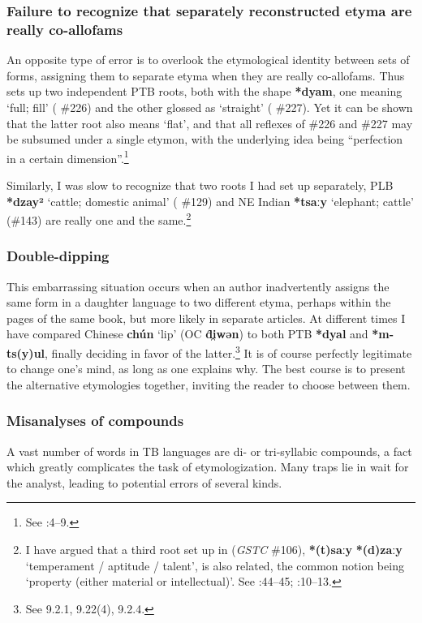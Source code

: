 \subsubsection{Failure to recognize that separately reconstructed etyma are really co-allofams}

An opposite type of error is to overlook the etymological identity between sets
of forms, assigning them to separate etyma when they are really co-allofams.
Thus \textit{} sets up two independent PTB roots, both with the shape \textbf{*dyam}, one
meaning ‘full; fill’ (\textit{} \#226) and the other glossed as ‘straight’ (\textit{} \#227).
Yet it can be shown that the latter root also means ‘flat’, and that all
reflexes of \#226 and \#227 may be subsumed under a single etymon, with the
underlying idea being “perfection in a certain dimension”.\footnote{See \citealt{JAM-DL}:4–9.}


Similarly, I was slow to recognize that two roots I had set up separately,
PLB \textbf{*dzay²} ‘cattle; domestic animal’ (\citealt{JAM-GSTC} \#129)
and NE Indian \textbf{*tsaːy} ‘elephant;
cattle’ (\#143) are really one and the same.\footnote{I have argued that a
third root set up in \citealt{JAM-GSTC} (\textit{GSTC} \#106), \textbf{*(t)saːy}  \textbf{*(d)zaːy} ‘temperament / aptitude / talent’, is also related, the common notion being ‘property (either material or
intellectual)’. See \citealt{JAM-GSTC}:44–45; \citeyear{JAM-DL}:10–13.}

\subsubsection{Double-dipping}
This embarrassing situation occurs when an author inadvertently assigns the same
form in a daughter language to two different etyma, perhaps within the pages of
the same book, but more likely in separate articles. At different times I have
compared Chinese \textbf{chún}  ‘lip’ (OC \textbf{d̑i̯wən}) to both PTB \textbf{*dyal}
and \textbf{*m-ts(y)ul}, finally deciding in favor of the latter.\footnote{See \textit{}
9.2.1, 9.22(4), 9.2.4.}  It
is of course perfectly legitimate to change one’s mind, as long as one explains
why. The best course is to present the alternative etymologies together,
inviting the reader to choose between them.

\subsubsection{Misanalyses of compounds}
A vast number of words in TB languages are di- or tri-syllabic compounds, a fact
which greatly complicates the task of etymologization. Many traps lie in wait
for the analyst, leading to potential errors of several kinds.

